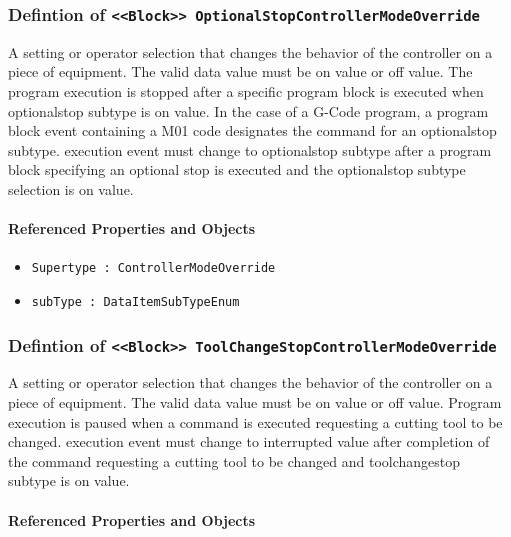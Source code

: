 \subsubsection{Defintion of \texttt{<<Block>> OptionalStopControllerModeOverride}}
  \label{type:OptionalStopControllerModeOverride}

\FloatBarrier

A setting or operator selection that changes the behavior of the controller on a piece of equipment. 
 The valid data value must be on value or off value.
 The program execution is stopped after a specific program block is executed when optionalstop subtype is on value.    
 In the case of a G-Code program, a program block event containing a M01 code designates the command for an optionalstop subtype. 
 execution event must change to optionalstop subtype after a program block specifying an optional stop is executed and the optionalstop subtype selection is on value.

\FloatBarrier
\paragraph{Referenced Properties and Objects}

\begin{itemize}
\item \texttt{Supertype : ControllerModeOverride}

\item \texttt{subType : DataItemSubTypeEnum}

\end{itemize}
\FloatBarrier
\subsubsection{Defintion of \texttt{<<Block>> ToolChangeStopControllerModeOverride}}
  \label{type:ToolChangeStopControllerModeOverride}

\FloatBarrier

A setting or operator selection that changes the behavior of the controller on a piece of equipment. 
 The valid data value must be on value or off value. 
 Program execution is paused when a command is executed requesting a cutting tool to be changed. 
 execution event must change to interrupted value after completion of the command requesting a cutting tool to be changed and toolchangestop subtype is on value.

\FloatBarrier
\paragraph{Referenced Properties and Objects}

